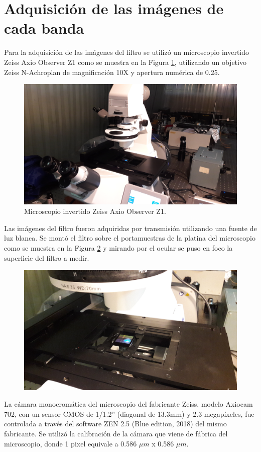 \documentclass{ctuthesis}
\begin{document}
\singlespacing
\section*{Adquisición de las imágenes de cada banda}

\hspace{0.5cm}Para la adquisición de las imágenes del filtro se utilizó un microscopio invertido Zeiss Axio Observer Z1 como se muestra en la Figura \ref{fig:ZEISSdellabo}, utilizando un objetivo Zeiss N-Achroplan de magnificación 10X y apertura numérica de 0.25.
\begin{figure}[H]
	\centering
	\includegraphics[scale=0.08]{Figs/defectosZEISS/b.jpg}
	\caption{Microscopio invertido Zeiss Axio Observer Z1.}
	\label{fig:ZEISSdellabo}
\end{figure}
Las imágenes del filtro fueron adquiridas por transmisión utilizando una fuente de luz blanca. Se montó el filtro sobre el portamuestras de la platina del microscopio como se muestra en la Figura \ref{fig:filtroenZEISS} y mirando por el ocular se puso en foco la superficie del filtro a medir.  
\begin{figure}[H]
	\centering
	\includegraphics[scale=0.08]{Figs/defectosZEISS/a.jpg}
	\caption{ }
	\label{fig:filtroenZEISS}
\end{figure}
La cámara monocromática del microscopio del fabricante Zeiss, modelo Axiocam 702, con un sensor CMOS de 1/1.2'' (diagonal de 13.3mm) y 2.3 megapíxeles, fue controlada a través del software ZEN 2.5 (Blue edition, 2018) del mismo fabricante. Se utilizó la calibración de la cámara 	que viene de fábrica del microscopio, donde 1 pixel equivale a 0.586 $\mu m$ x 0.586 $\mu m$.
\end{document}
